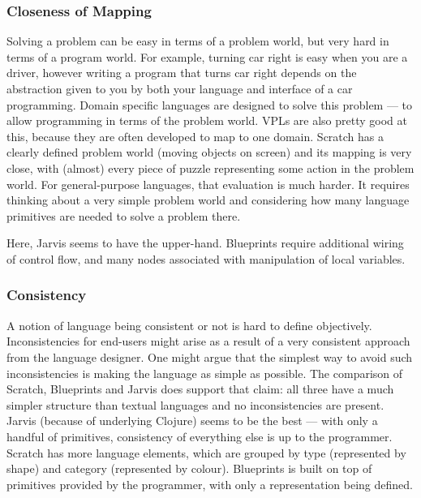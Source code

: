 \documentclass[11pt]{scrartcl}
\begin{document}
\subsubsection{Closeness of Mapping}
Solving a problem can be easy in terms of a problem world, but very hard in
terms of a program world.
For example, turning car right is easy when you are a driver, however writing a
program that turns car right depends on the abstraction given to you by both
your language and interface of a car programming.
Domain specific languages are designed to solve this problem --- to allow
programming in terms of the problem world.
VPLs are also pretty good at this, because they are often developed to map to
one domain.
Scratch has a clearly defined problem world (moving objects on screen) and its
mapping is very close, with (almost) every piece of puzzle representing some
action in the problem world.
For general-purpose languages, that evaluation is much harder.
It requires thinking about a very simple problem world and considering how many
language primitives are needed to solve a problem there.

Here, Jarvis seems to have the upper-hand.
Blueprints require additional wiring of control flow, and many nodes associated
with manipulation of local variables.

\subsubsection{Consistency}
A notion of language being consistent or not is hard to define objectively.
Inconsistencies for end-users might arise as a result of a very consistent
approach from the language designer.
One might argue that the simplest way to avoid such inconsistencies is making
the language as simple as possible.
The comparison of Scratch, Blueprints and Jarvis does support that claim: all
three have a much simpler structure than textual languages and no
inconsistencies are present.
Jarvis (because of underlying Clojure) seems to be the best --- with only a
handful of primitives, consistency of everything else is up to the programmer.
Scratch has more language elements, which are grouped by type (represented by
shape) and category (represented by colour).
Blueprints is built on top of primitives provided by the programmer, with only a
representation being defined.
\end{document}
